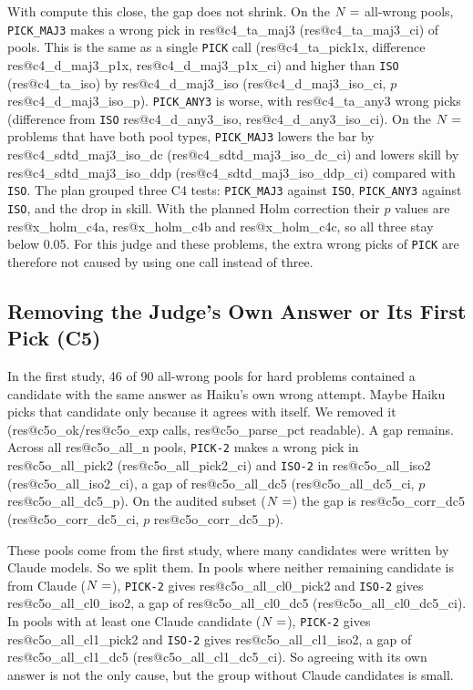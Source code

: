 \documentclass[10pt,twocolumn]{article}
\makeatletter
\newcommand{\res}[1]{\csname res@#1\endcsname}
\makeatother
\begin{document}
With compute this close, the gap does not shrink. On the $N=\res{c4_n_ta}$ all-wrong pools, \texttt{PICK\_MAJ3} makes a wrong pick in \res{c4_ta_maj3} (\res{c4_ta_maj3_ci}) of pools. This is the same as a single \texttt{PICK} call (\res{c4_ta_pick1x}, difference \res{c4_d_maj3_p1x}, \res{c4_d_maj3_p1x_ci}) and higher than \texttt{ISO} (\res{c4_ta_iso}) by \res{c4_d_maj3_iso} (\res{c4_d_maj3_iso_ci}, $p$ \res{c4_d_maj3_iso_p}). \texttt{PICK\_ANY3} is worse, with \res{c4_ta_any3} wrong picks (difference from \texttt{ISO} \res{c4_d_any3_iso}, \res{c4_d_any3_iso_ci}). On the $N=\res{c4_n_tp}$ problems that have both pool types, \texttt{PICK\_MAJ3} lowers the bar by \res{c4_sdtd_maj3_iso_dc} (\res{c4_sdtd_maj3_iso_dc_ci}) and lowers skill by \res{c4_sdtd_maj3_iso_ddp} (\res{c4_sdtd_maj3_iso_ddp_ci}) compared with \texttt{ISO}. The plan grouped three C4 tests: \texttt{PICK\_MAJ3} against \texttt{ISO}, \texttt{PICK\_ANY3} against \texttt{ISO}, and the drop in skill. With the planned Holm correction their $p$ values are \res{x_holm_c4a}, \res{x_holm_c4b} and \res{x_holm_c4c}, so all three stay below 0.05. For this judge and these problems, the extra wrong picks of \texttt{PICK} are therefore not caused by using one call instead of three.

\subsection{Removing the Judge's Own Answer or Its First Pick (C5)}
In the first study, 46 of 90 all-wrong pools for hard problems contained a candidate with the same answer as Haiku's own wrong attempt. Maybe Haiku picks that candidate only because it agrees with itself. We removed it (\res{c5o_ok}/\res{c5o_exp} calls, \res{c5o_parse_pct} readable). A gap remains. Across all \res{c5o_all_n} pools, \texttt{PICK-2} makes a wrong pick in \res{c5o_all_pick2} (\res{c5o_all_pick2_ci}) and \texttt{ISO-2} in \res{c5o_all_iso2} (\res{c5o_all_iso2_ci}), a gap of \res{c5o_all_dc5} (\res{c5o_all_dc5_ci}, $p$ \res{c5o_all_dc5_p}). On the audited subset ($N=\res{c5o_corr_n}$) the gap is \res{c5o_corr_dc5} (\res{c5o_corr_dc5_ci}, $p$ \res{c5o_corr_dc5_p}).

These pools come from the first study, where many candidates were written by Claude models. So we split them. In pools where neither remaining candidate is from Claude ($N=\res{c5o_all_cl0_n}$), \texttt{PICK-2} gives \res{c5o_all_cl0_pick2} and \texttt{ISO-2} gives \res{c5o_all_cl0_iso2}, a gap of \res{c5o_all_cl0_dc5} (\res{c5o_all_cl0_dc5_ci}). In pools with at least one Claude candidate ($N=\res{c5o_all_cl1_n}$), \texttt{PICK-2} gives \res{c5o_all_cl1_pick2} and \texttt{ISO-2} gives \res{c5o_all_cl1_iso2}, a gap of \res{c5o_all_cl1_dc5} (\res{c5o_all_cl1_dc5_ci}). So agreeing with its own answer is not the only cause, but the group without Claude candidates is small.
\end{document}

